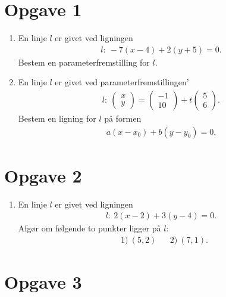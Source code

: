 \section*{Opgave 1}
\begin{enumerate}[label=\roman*)]
	\item En linje $l$ er givet ved ligningen 
	\begin{align*}
		l: \ -7(x-4) + 2(y+5) =0.
	\end{align*}
	Bestem en parameterfremstilling for $l$. 
	\item En linje $l$ er givet ved parameterfremstillingen'
	\begin{align*}
		l: \ 
		\begin{pmatrix}
			x \\ y
		\end{pmatrix}=
		\begin{pmatrix}
			-1 \\ 10
		\end{pmatrix}+ t
		\begin{pmatrix}
			5  \\ 6
		\end{pmatrix}.
	\end{align*}
	Bestem en ligning for $l$ på formen 
	\begin{align*}
		a(x-x_0) + b(y-y_0) = 0.
	\end{align*}
\end{enumerate}

\section*{Opgave 2}
\begin{enumerate}[label=\roman*)]
	\item En linje $l$ er givet ved ligningen
	\begin{align*}
		l: \ 2(x-2) + 3(y-4) = 0.
	\end{align*}
	Afgør om følgende to punkter ligger på $l$:
	\begin{align*}
	&1) \ (5,2)  &&2) \ (7,1).
	\end{align*}
\end{enumerate}

\section*{Opgave 3}

